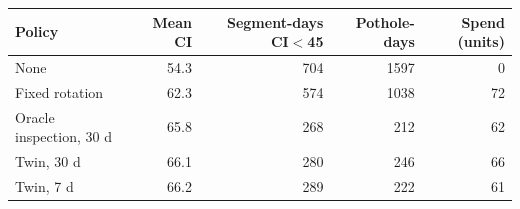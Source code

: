 \begin{tabular}{lrrrr}
\toprule
Policy & Mean CI & Segment-days CI$<$45 & Pothole-days & Spend (units)\\
\midrule
None & 54.3 & 704 & 1597 & 0\\
Fixed rotation & 62.3 & 574 & 1038 & 72\\
Oracle inspection, 30 d & 65.8 & 268 & 212 & 62\\
Twin, 30 d & 66.1 & 280 & 246 & 66\\
Twin, 7 d & 66.2 & 289 & 222 & 61\\
\bottomrule
\end{tabular}
